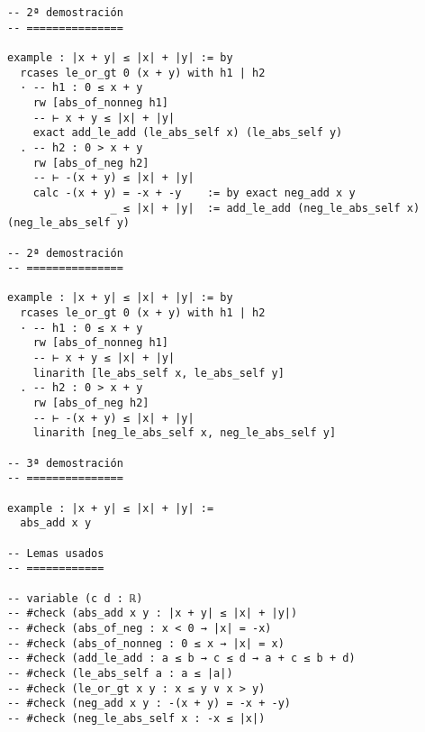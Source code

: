 \begin{verbatim}
-- 2ª demostración
-- ===============

example : |x + y| ≤ |x| + |y| := by
  rcases le_or_gt 0 (x + y) with h1 | h2
  · -- h1 : 0 ≤ x + y
    rw [abs_of_nonneg h1]
    -- ⊢ x + y ≤ |x| + |y|
    exact add_le_add (le_abs_self x) (le_abs_self y)
  . -- h2 : 0 > x + y
    rw [abs_of_neg h2]
    -- ⊢ -(x + y) ≤ |x| + |y|
    calc -(x + y) = -x + -y    := by exact neg_add x y
                _ ≤ |x| + |y|  := add_le_add (neg_le_abs_self x) (neg_le_abs_self y)

-- 2ª demostración
-- ===============

example : |x + y| ≤ |x| + |y| := by
  rcases le_or_gt 0 (x + y) with h1 | h2
  · -- h1 : 0 ≤ x + y
    rw [abs_of_nonneg h1]
    -- ⊢ x + y ≤ |x| + |y|
    linarith [le_abs_self x, le_abs_self y]
  . -- h2 : 0 > x + y
    rw [abs_of_neg h2]
    -- ⊢ -(x + y) ≤ |x| + |y|
    linarith [neg_le_abs_self x, neg_le_abs_self y]

-- 3ª demostración
-- ===============

example : |x + y| ≤ |x| + |y| :=
  abs_add x y

-- Lemas usados
-- ============

-- variable (c d : ℝ)
-- #check (abs_add x y : |x + y| ≤ |x| + |y|)
-- #check (abs_of_neg : x < 0 → |x| = -x)
-- #check (abs_of_nonneg : 0 ≤ x → |x| = x)
-- #check (add_le_add : a ≤ b → c ≤ d → a + c ≤ b + d)
-- #check (le_abs_self a : a ≤ |a|)
-- #check (le_or_gt x y : x ≤ y ∨ x > y)
-- #check (neg_add x y : -(x + y) = -x + -y)
-- #check (neg_le_abs_self x : -x ≤ |x|)
\end{verbatim}

